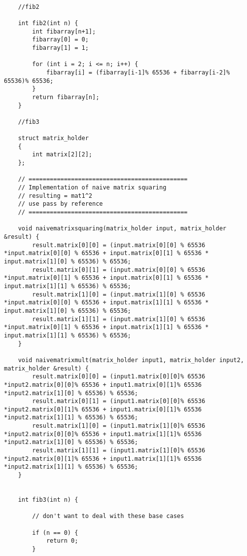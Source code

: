 \documentclass[11pt]{article}
\begin{document}
\begin{enumerate}
\begin{verbatim}
    
    //fib2
    
    int fib2(int n) {
        int fibarray[n+1];
        fibarray[0] = 0;
        fibarray[1] = 1;
    
        for (int i = 2; i <= n; i++) {
            fibarray[i] = (fibarray[i-1]% 65536 + fibarray[i-2]% 65536)% 65536;
        }
        return fibarray[n];
    }
    
    //fib3
    
    struct matrix_holder
    {
        int matrix[2][2];
    };
    
    // =============================================
    // Implementation of naive matrix squaring
    // resulting = mat1^2
    // use pass by reference
    // =============================================
    
    void naivematrixsquaring(matrix_holder input, matrix_holder &result) {
        result.matrix[0][0] = (input.matrix[0][0] % 65536 *input.matrix[0][0] % 65536 + input.matrix[0][1] % 65536 * input.matrix[1][0] % 65536) % 65536;
        result.matrix[0][1] = (input.matrix[0][0] % 65536 *input.matrix[0][1] % 65536 + input.matrix[0][1] % 65536 * input.matrix[1][1] % 65536) % 65536;
        result.matrix[1][0] = (input.matrix[1][0] % 65536 *input.matrix[0][0] % 65536 + input.matrix[1][1] % 65536 * input.matrix[1][0] % 65536) % 65536;
        result.matrix[1][1] = (input.matrix[1][0] % 65536 *input.matrix[0][1] % 65536 + input.matrix[1][1] % 65536 * input.matrix[1][1] % 65536) % 65536;
    }
    
    void naivematrixmult(matrix_holder input1, matrix_holder input2, matrix_holder &result) {
        result.matrix[0][0] = (input1.matrix[0][0]% 65536 *input2.matrix[0][0]% 65536 + input1.matrix[0][1]% 65536 *input2.matrix[1][0] % 65536) % 65536;
        result.matrix[0][1] = (input1.matrix[0][0]% 65536 *input2.matrix[0][1]% 65536 + input1.matrix[0][1]% 65536 *input2.matrix[1][1] % 65536) % 65536;
        result.matrix[1][0] = (input1.matrix[1][0]% 65536 *input2.matrix[0][0]% 65536 + input1.matrix[1][1]% 65536 *input2.matrix[1][0] % 65536) % 65536;
        result.matrix[1][1] = (input1.matrix[1][0]% 65536 *input2.matrix[0][1]% 65536 + input1.matrix[1][1]% 65536 *input2.matrix[1][1] % 65536) % 65536;
    }
    
    
    int fib3(int n) {
    
        // don't want to deal with these base cases
    
        if (n == 0) {
            return 0;
        }
    

\end{verbatim}
\end{enumerate}
\end{document}
